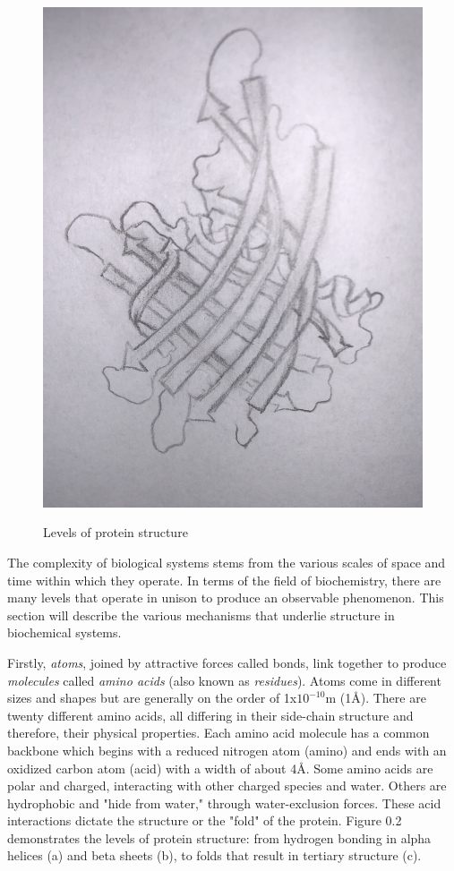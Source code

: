 \documentclass[12pt]{ucsddissertation}
\begin{document}
\begin{dissertationintroduction}
\begin{figure}
\begin{minipage}{\linewidth}
    \includegraphics[width=0.65\linewidth]{tertiary0.jpg}
    \label{fig:0c}
\end{minipage}
\caption{Levels of protein structure}\label{fig:0}
\end{figure}

The complexity of biological systems stems from the various scales of space and time within which they operate. In terms of the field of biochemistry, there are many levels that operate in unison to produce an observable phenomenon. This section will describe the various mechanisms that underlie structure in biochemical systems.

Firstly, \textit{atoms}, joined by attractive forces called bonds, link together to produce \textit{molecules} called \textit{amino acids} (also known as \textit{residues}). Atoms come in different sizes and shapes but are generally on the order of 1x$10^{-10}$m (1\si{\angstrom}). There are twenty different amino acids, all differing in their side-chain structure and therefore, their physical properties. Each amino acid molecule has a common backbone which begins with a reduced nitrogen atom (amino) and ends with an oxidized carbon atom (acid) with a width of about 4\si{\angstrom}. Some amino acids are polar and charged, interacting with other charged species and water. Others are hydrophobic and "hide from water," through water-exclusion forces. These acid interactions dictate the structure or the "fold" of the protein. Figure 0.2 demonstrates the levels of protein structure: from hydrogen bonding in alpha helices (a) and beta sheets (b), to folds that result in tertiary structure (c).


\end{dissertationintroduction}
\end{document}
